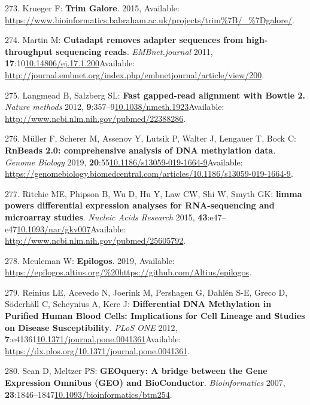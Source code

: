 \documentclass[
]{book}
\begin{document}
\leavevmode\hypertarget{ref-Krueger2015}{}%
273. Krueger F: \textbf{Trim Galore}. 2015, Available: \url{https://www.bioinformatics.babraham.ac.uk/projects/trim\%7B/_\%7Dgalore/}.

\leavevmode\hypertarget{ref-Martin2011}{}%
274. Martin M: \textbf{Cutadapt removes adapter sequences from high-throughput sequencing reads}. \emph{EMBnet.journal} 2011, \textbf{17}:10\href{https://doi.org/10.14806/ej.17.1.200}{10.14806/ej.17.1.200}Available: \url{http://journal.embnet.org/index.php/embnetjournal/article/view/200}.

\leavevmode\hypertarget{ref-Langmead2012}{}%
275. Langmead B, Salzberg SL: \textbf{Fast gapped-read alignment with Bowtie 2.} \emph{Nature methods} 2012, \textbf{9}:357--9\href{https://doi.org/10.1038/nmeth.1923}{10.1038/nmeth.1923}Available: \url{http://www.ncbi.nlm.nih.gov/pubmed/22388286}.

\leavevmode\hypertarget{ref-Muller2019}{}%
276. Müller F, Scherer M, Assenov Y, Lutsik P, Walter J, Lengauer T, Bock C: \textbf{RnBeads 2.0: comprehensive analysis of DNA methylation data}. \emph{Genome Biology} 2019, \textbf{20}:55\href{https://doi.org/10.1186/s13059-019-1664-9}{10.1186/s13059-019-1664-9}Available: \url{https://genomebiology.biomedcentral.com/articles/10.1186/s13059-019-1664-9}.

\leavevmode\hypertarget{ref-Ritchie2015}{}%
277. Ritchie ME, Phipson B, Wu D, Hu Y, Law CW, Shi W, Smyth GK: \textbf{limma powers differential expression analyses for RNA-sequencing and microarray studies}. \emph{Nucleic Acids Research} 2015, \textbf{43}:e47--e47\href{https://doi.org/10.1093/nar/gkv007}{10.1093/nar/gkv007}Available: \url{http://www.ncbi.nlm.nih.gov/pubmed/25605792}.

\leavevmode\hypertarget{ref-Meuleman2019}{}%
278. Meuleman W: \textbf{Epilogos}. 2019, Available: \url{https://epilogos.altius.org/\%20https://github.com/Altius/epilogos}.

\leavevmode\hypertarget{ref-Reinius2012}{}%
279. Reinius LE, Acevedo N, Joerink M, Pershagen G, Dahlén S-E, Greco D, Söderhäll C, Scheynius A, Kere J: \textbf{Differential DNA Methylation in Purified Human Blood Cells: Implications for Cell Lineage and Studies on Disease Susceptibility}. \emph{PLoS ONE} 2012, \textbf{7}:e41361\href{https://doi.org/10.1371/journal.pone.0041361}{10.1371/journal.pone.0041361}Available: \url{https://dx.plos.org/10.1371/journal.pone.0041361}.

\leavevmode\hypertarget{ref-Davis2007p}{}%
280. Sean D, Meltzer PS: \textbf{GEOquery: A bridge between the Gene Expression Omnibus (GEO) and BioConductor}. \emph{Bioinformatics} 2007, \textbf{23}:1846--1847\href{https://doi.org/10.1093/bioinformatics/btm254}{10.1093/bioinformatics/btm254}.
\end{document}
